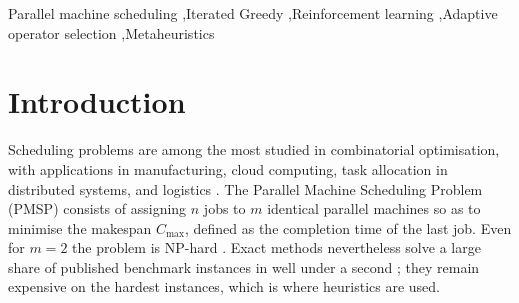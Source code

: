 \documentclass[final,3p,times,11pt,authoryear]{elsarticle}
\begin{document}
\begin{frontmatter}
\begin{keyword}
Parallel machine scheduling \sep Iterated Greedy \sep Reinforcement
learning \sep Adaptive operator selection \sep Metaheuristics
\end{keyword}

\end{frontmatter}


\section{Introduction}
\label{sec:intro}

Scheduling problems are among the most studied in combinatorial
optimisation, with applications in manufacturing, cloud computing,
task allocation in distributed systems, and logistics
\citep{Pinedo2016}.
The Parallel Machine Scheduling Problem (PMSP) consists of assigning
$n$ jobs to $m$ identical parallel machines so as to minimise the
makespan $C_{\max}$, defined as the completion time of the last job.
Even for $m=2$ the problem is NP-hard \citep{GareyJohnson1979}.
Exact methods nevertheless solve a large share of published benchmark
instances in well under a second \citep{OstojicEtAl2025}; they remain
expensive on the hardest instances, which is where heuristics are
used.
\end{document}
